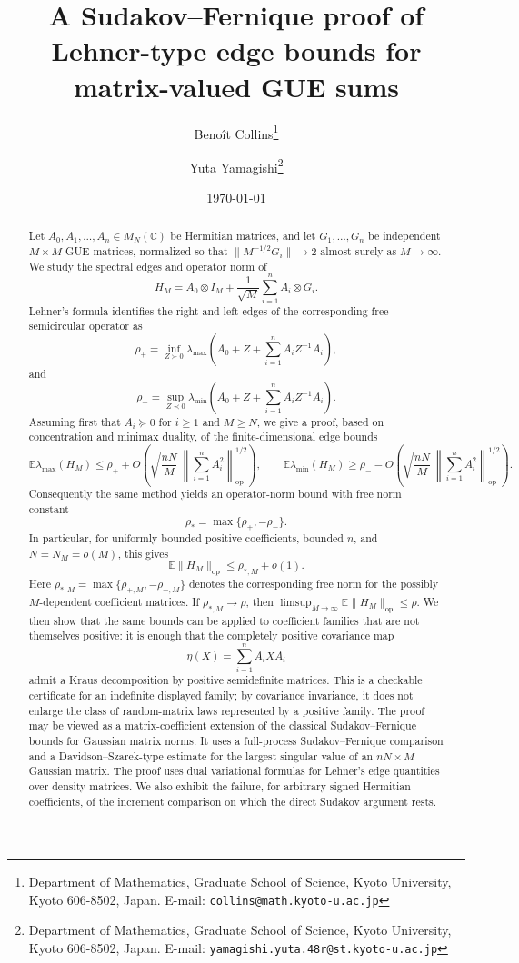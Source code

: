 \documentclass{article}
\title{A Sudakov--Fernique proof of Lehner-type edge bounds for matrix-valued GUE sums}
\author{Beno\^{i}t Collins\thanks{Department of Mathematics, Graduate School of Science,
  Kyoto University, Kyoto 606-8502, Japan.
  E-mail: \texttt{collins@math.kyoto-u.ac.jp}}
\and
Yuta Yamagishi\thanks{Department of Mathematics, Graduate School of Science,
  Kyoto University, Kyoto 606-8502, Japan.
  E-mail: \texttt{yamagishi.yuta.48r@st.kyoto-u.ac.jp}}
  }
\date{\today}
\newcommand{\C}{\mathbb C}
\newcommand{\E}{\mathbb E}
\newcommand{\op}{\mathrm{op}}
\newcommand{\Arow}{\left\|\sum_{i=1}^n A_i^2\right\|_{\op}^{1/2}}
\begin{document}
\maketitle

\begin{abstract}
	Let $A_0,A_1,\ldots,A_n\in M_N(\C)$ be Hermitian matrices, and let
	$G_1,\ldots,G_n$ be independent $M\times M$ GUE matrices,
	normalized so that $\|M^{-1/2}G_i\|\to2$ almost surely as $M\to\infty$.  We
	study the spectral edges and operator norm of
	\[
		H_M=A_0\otimes I_M+\frac1{\sqrt M}\sum_{i=1}^n A_i\otimes G_i .
	\]
	Lehner's formula identifies the right and left edges of the corresponding free
	semicircular operator as
	\[
		\rho_+=\inf_{Z\succ0}\lambda_{\max}\left(A_0+Z+\sum_{i=1}^n A_iZ^{-1}A_i\right),
	\]
	and
	\[
		\rho_-=\sup_{Z\prec0}\lambda_{\min}\left(A_0+Z+\sum_{i=1}^n A_iZ^{-1}A_i\right).
	\]
	Assuming first that $A_i\succeq0$ for $i\ge1$ and $M\ge N$, we give a
	proof, based on concentration and minimax duality, of the finite-dimensional
	edge bounds
	\[
		\E\lambda_{\max}(H_M)
		\le
		\rho_++O\!\left(\sqrt{\frac{nN}{M}}\,\Arow\right),
		\qquad
		\E\lambda_{\min}(H_M)
		\ge
		\rho_--O\!\left(\sqrt{\frac{nN}{M}}\,\Arow\right).
	\]
	Consequently the same method yields an operator-norm bound with free norm
	constant
	\[
		\rho_*=\max\{\rho_+,-\rho_-\}.
	\]
	In particular, for uniformly bounded positive coefficients, bounded $n$, and
	$N=N_M=o(M)$, this gives
	\[
		\E\|H_M\|_{\op}\le \rho_{*,M}+o(1).
	\]
	Here $\rho_{*,M}=\max\{\rho_{+,M},-\rho_{-,M}\}$ denotes the corresponding free
	norm for the possibly
	$M$-dependent coefficient matrices.  If $\rho_{*,M}\to\rho$, then
	$\limsup_{M\to\infty}\E\|H_M\|_{\op}\le\rho$.
	We then show that the same bounds can be applied to coefficient families
	that are not themselves positive: it is enough that the completely positive
	covariance map
	\[
		\eta(X)=\sum_{i=1}^n A_iXA_i
	\]
	admit a Kraus decomposition by positive semidefinite matrices.  This
	is a checkable certificate for an indefinite displayed family; by covariance
	invariance, it does not enlarge the class of random-matrix laws represented
	by a positive family.
	The proof may be viewed as a matrix-coefficient extension of the classical
	Sudakov--Fernique bounds for Gaussian matrix norms.  It uses a full-process
	Sudakov--Fernique comparison and a
	Davidson--Szarek-type estimate for the largest singular value of an
	$nN\times M$ Gaussian matrix.  The proof uses dual variational formulas for
	Lehner's edge quantities over density matrices.
	We also exhibit the failure, for arbitrary signed Hermitian coefficients, of
	the increment comparison on which the direct Sudakov argument rests.
\end{abstract}
\end{document}
